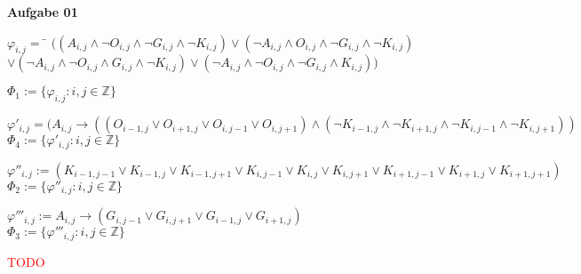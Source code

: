 \documentclass[a4paper,10pt]{article}
\begin{document}
	\parindent0pt
	\textbf{Aufgabe 01} \\
	\begin{compactenum} [(a)]
		\item
		\begin{compactitem}
			\item
			\begin{tabbing}
				$ \varphi_{i,j} = $ 
				\= $ ((A_{i,j}\wedge \lnot O_{i,j} \wedge \lnot G_{i,j}\wedge \lnot K_{i,j})\vee(\lnot A_{i,j}\wedge O_{i,j}\wedge\lnot G_{i,j}\wedge \lnot K_{i,j}) $ \\
				\> $ \vee ( \lnot A_{i,j}\wedge \lnot O_{i,j}\wedge G_{i,j}\wedge \lnot K_{i,j})\vee( \lnot A_{i,j}\wedge \lnot O_{i,j}\wedge \lnot G_{i,j}\wedge K_{i,j}))$
			\end{tabbing}
			$ \varPhi_1 := \{\varphi_{i,j} : i,j \in \mathbb{Z}\} $
			
			\item $ \varphi'_{i,j} = (A_{i,j} \rightarrow ((O_{i-1,j} \vee O_{i+1,j} \vee O_{i,j-1} \vee O_{i,j+1}) \wedge (\lnot K_{i-1,j} \wedge \lnot K_{i+1,j} \wedge \lnot K_{i,j-1} \wedge \lnot K_{i,j+1})) $ \\
			$ \varPhi_4 := \{\varphi'_{i,j} : i,j \in \mathbb{Z}\} $
		\end{compactitem} 
		\item $ \varphi''_{i,j} := (K_{i-1,j-1}\vee K_{i-1,j}\vee K_{i-1,j+1}\vee K_{i,j-1}\vee K_{i,j}\vee K_{i,j+1}\vee K_{i+1,j-1}\vee K_{i+1,j}\vee K_{i+1,j+1}) $ \\
		$ \varPhi_2 := \{\varphi''_{i,j} : i,j \in \mathbb{Z}\} $
		\item $ \varphi'''_{i,j} := A_{i,j}\rightarrow(G_{i,j-1}\vee G_{i,j+1}\vee G_{i-1,j}\vee G_{i+1,j}) $ \\
		$ \varPhi_3 := \{\varphi'''_{i,j} : i,j \in \mathbb{Z} \} $
		\item \textcolor{red}{TODO}
	\end{compactenum} \
	
\end{document}
